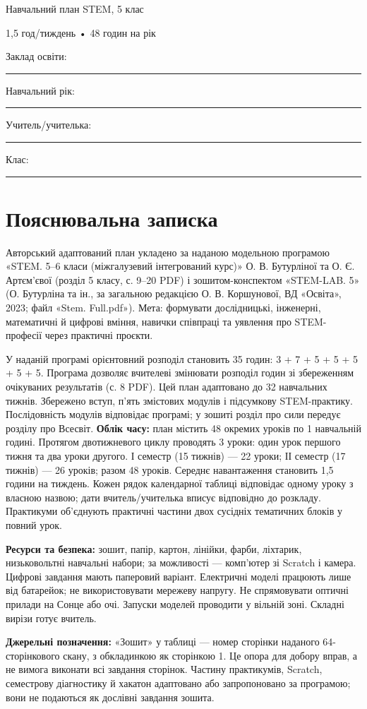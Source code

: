 \documentclass[10pt,a4paper,landscape]{article}
\begin{document}
{\LARGE\color{accent} Навчальний план STEM, 5 клас}

{\large 1,5 год/тиждень • 48 годин на рік}

Заклад освіти: \rule{90mm}{0.3pt}\quad Навчальний рік: \rule{30mm}{0.3pt}

Учитель/учителька: \rule{95mm}{0.3pt}\quad Клас: \rule{25mm}{0.3pt}
\section*{Пояснювальна записка}
Авторський адаптований план укладено за наданою модельною програмою «STEM. 5--6 класи (міжгалузевий інтегрований курс)» О. В. Бутурліної та О. Є. Артєм’євої (розділ 5 класу, с. 9--20 PDF) і зошитом-конспектом «STEM-LAB. 5» (О. Бутурліна та ін., за загальною редакцією О. В. Коршунової, ВД «Освіта», 2023; файл «Stem. Full.pdf»).
Мета: формувати дослідницькі, інженерні, математичні й цифрові вміння, навички співпраці та уявлення про STEM-професії через практичні проєкти.

У наданій програмі орієнтовний розподіл становить 35 годин: 3 + 7 + 5 + 5 + 5 + 5 + 5. Програма дозволяє вчителеві змінювати розподіл годин зі збереженням очікуваних результатів (с. 8 PDF). Цей план адаптовано до 32 навчальних тижнів. Збережено вступ, п’ять змістових модулів і підсумкову STEM-практику. Послідовність модулів відповідає програмі; у зошиті розділ про сили передує розділу про Всесвіт.
\textbf{Облік часу:} план містить 48 окремих уроків по 1 навчальній годині. Протягом двотижневого циклу проводять 3 уроки: один урок першого тижня та два уроки другого. І семестр (15 тижнів) — 22 уроки; ІІ семестр (17 тижнів) — 26 уроків; разом 48 уроків. Середнє навантаження становить 1,5 години на тиждень. Кожен рядок календарної таблиці відповідає одному уроку з власною назвою; дати вчитель/учителька вписує відповідно до розкладу. Практикуми об’єднують практичні частини двох сусідніх тематичних блоків у повний урок.

\textbf{Ресурси та безпека:} зошит, папір, картон, лінійки, фарби, ліхтарик, низьковольтні навчальні набори; за можливості — комп’ютер зі Scratch і камера. Цифрові завдання мають паперовий варіант. Електричні моделі працюють лише від батарейок; не використовувати мережеву напругу. Не спрямовувати оптичні прилади на Сонце або очі. Запуски моделей проводити у вільній зоні. Складні вирізи готує вчитель.

\textbf{Джерельні позначення:} «Зошит» у таблиці — номер сторінки наданого 64-сторінкового скану, з обкладинкою як сторінкою 1. Це опора для добору вправ, а не вимога виконати всі завдання сторінок. Частину практикумів, Scratch, семестрову діагностику й хакатон адаптовано або запропоновано за програмою; вони не подаються як дослівні завдання зошита.
\newpage
\end{document}

